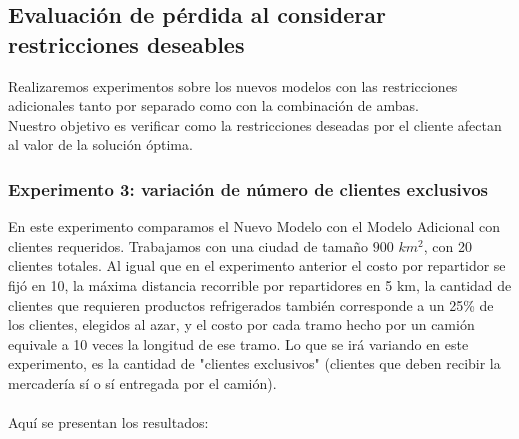 \documentclass{article}
\begin{document}
    \subsection{Evaluación de pérdida al considerar restricciones deseables}
    Realizaremos experimentos sobre los nuevos modelos con las restricciones adicionales tanto por separado como con la combinación de ambas.\\
    Nuestro objetivo es verificar como la restricciones deseadas por el cliente afectan al valor de la solución óptima.


    \subsubsection{Experimento 3: variación de número de clientes exclusivos}

    En este experimento comparamos el Nuevo Modelo con el Modelo Adicional con clientes requeridos. Trabajamos con una ciudad de tamaño $900$ $km^{2}$, con 20 clientes totales. Al igual que en el experimento anterior el costo por repartidor se fijó en 10, la máxima distancia recorrible por repartidores en 5 km, la cantidad de clientes que requieren productos refrigerados también corresponde a un 25\% de los clientes, elegidos al azar, y el costo por cada tramo hecho por un camión equivale a 10 veces la longitud de ese tramo. Lo que se irá variando en este experimento, es la cantidad de "clientes exclusivos" (clientes que deben recibir la mercadería sí o sí entregada por el camión). \\
    \\
    Aquí se presentan los resultados:
\end{document}

